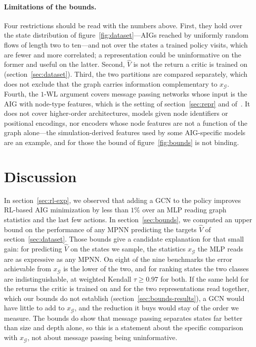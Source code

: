 \documentclass{article}
\begin{document}
\paragraph{Limitations of the bounds.} Four restrictions should be read with the numbers above.
First, they hold over the state distribution of figure~\ref{fig:dataset}---AIGs reached by uniformly random flows of length two to ten---and not over the states a trained policy visits, which are fewer and more correlated; a representation could be uninformative on the former and useful on the latter.
Second, $\widehat{V}$ is not the return a critic is trained on (section~\ref{sec:dataset}).
Third, the two partitions are compared separately, which does not exclude that the graph carries information complementary to $x_\mathcal{G}$.
Fourth, the $1$-WL argument covers message passing networks whose input is the AIG with node-type features, which is the setting of section~\ref{sec:repr} and of~\citet{rl-gnn1}.
It does not cover higher-order architectures, models given node identifiers or positional encodings, nor encoders whose node features are not a function of the graph alone---the simulation-derived features used by some AIG-specific models are an example, and for those the bound of figure~\ref{fig:bounds} is not binding.

\section{Discussion}\label{sec:discussion}
In section~\ref{sec:rl-exp}, we observed that adding a GCN to the policy improves RL-based AIG minimization by less than $1\%$ over an MLP reading graph statistics and the last few actions.
In section~\ref{sec:bounds}, we computed an upper bound on the performance of any MPNN predicting the targets $\widehat{V}$ of section~\ref{sec:dataset}.
Those bounds give a candidate explanation for that small gain: for predicting $\widehat{V}$ on the states we sample, the statistics $x_\mathcal{G}$ the MLP reads are as expressive as any MPNN.
On eight of the nine benchmarks the error achievable from $x_\mathcal{G}$ is the lower of the two, and for ranking states the two classes are indistinguishable, at weighted Kendall $\tau \geq 0.97$ for both.
If the same held for the returns the critic is trained on and for the two representations read together, which our bounds do not establish (section~\ref{sec:bounds-results}), a GCN would have little to add to $x_\mathcal{G}$, and the reduction it buys would stay of the order we measure.
The bounds do show that message passing separates states far better than size and depth alone, so this is a statement about the specific comparison with $x_\mathcal{G}$, not about message passing being uninformative.
\end{document}
